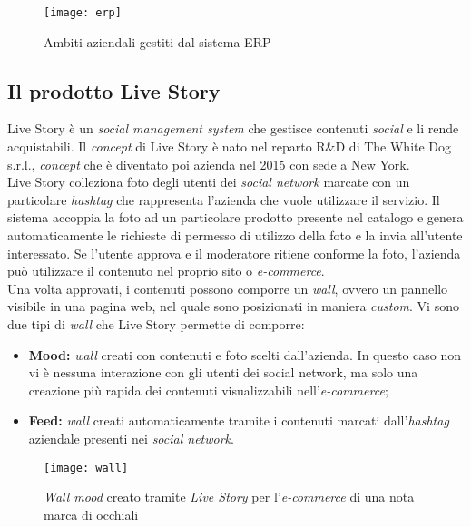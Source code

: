 \label{ERP}
\begin{figure}[ht]
	\begin{center}
		\texttt{[image: erp]}
		\caption{Ambiti aziendali gestiti dal sistema ERP}
	\end{center}
\end{figure}
\FloatBarrier

\subsection{Il prodotto Live Story}

Live Story è un \textit{social management system} che gestisce contenuti \textit{social} e li rende acquistabili. Il \textit{concept} di Live Story è nato nel reparto R\&D di The White Dog s.r.l., \textit{concept} che è diventato poi azienda nel 2015 con sede a New York. \\
Live Story colleziona foto degli utenti dei \textit{social network} marcate con un particolare \textit{hashtag} che rappresenta l'azienda che vuole utilizzare il servizio. Il sistema accoppia la foto ad un particolare prodotto presente nel catalogo e genera automaticamente le richieste di permesso di utilizzo della foto e la invia all'utente interessato. Se l'utente approva e il moderatore ritiene conforme la foto, l'azienda può utilizzare il contenuto nel proprio sito o \textit{e-commerce}. \\
Una volta approvati, i contenuti possono comporre un \textit{wall}, ovvero un pannello visibile in una pagina web, nel quale sono posizionati in maniera \textit{custom}. Vi sono due tipi di \textit{wall} che Live Story permette di comporre:

\begin{itemize}
	\item \textbf{Mood:} \textit{wall} creati con contenuti e foto scelti dall'azienda. In questo caso non vi è nessuna interazione con gli utenti dei social network, ma solo una creazione più rapida dei contenuti visualizzabili nell'\textit{e-commerce};
	\item \textbf{Feed:} \textit{wall} creati automaticamente tramite i contenuti marcati dall'\textit{hashtag} aziendale presenti nei \textit{social network}.
\end{itemize}

\label{Wall}
\begin{figure}[ht]
	\begin{center}
		\texttt{[image: wall]}
		\caption{\textit{Wall mood} creato tramite \textit{Live Story} per l'\textit{e-commerce} di una nota marca di occhiali}
	\end{center}
\end{figure}
\FloatBarrier

